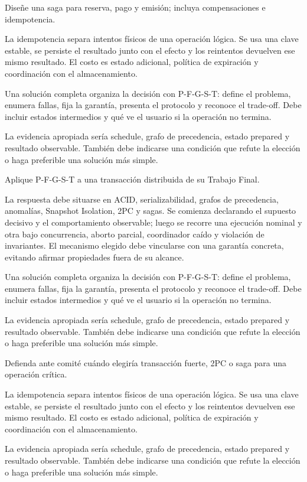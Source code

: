 \documentclass[variant=guia,cover=institutional,mode=screen]{ua-engineering-v6-article}
\begin{document}
\begin{uaexercise}
Diseñe una saga para reserva, pago y emisión; incluya compensaciones e idempotencia.
\end{uaexercise}
\begin{uaanswer}
La idempotencia separa intentos físicos de una operación lógica. Se usa una clave estable, se persiste el resultado junto con el efecto y los reintentos devuelven ese mismo resultado. El costo es estado adicional, política de expiración y coordinación con el almacenamiento.

Una solución completa organiza la decisión con P-F-G-S-T: define el problema, enumera fallas, fija la garantía, presenta el protocolo y reconoce el trade-off. Debe incluir estados intermedios y qué ve el usuario si la operación no termina.

La evidencia apropiada sería schedule, grafo de precedencia, estado prepared y resultado observable. También debe indicarse una condición que refute la elección o haga preferible una solución más simple.
\end{uaanswer}

\begin{uaexercise}
Aplique P-F-G-S-T a una transacción distribuida de su Trabajo Final.
\end{uaexercise}
\begin{uaanswer}
La respuesta debe situarse en ACID, serializabilidad, grafos de precedencia, anomalías, Snapshot Isolation, 2PC y sagas. Se comienza declarando el supuesto decisivo y el comportamiento observable; luego se recorre una ejecución nominal y otra bajo concurrencia, aborto parcial, coordinador caído y violación de invariantes. El mecanismo elegido debe vincularse con una garantía concreta, evitando afirmar propiedades fuera de su alcance.

Una solución completa organiza la decisión con P-F-G-S-T: define el problema, enumera fallas, fija la garantía, presenta el protocolo y reconoce el trade-off. Debe incluir estados intermedios y qué ve el usuario si la operación no termina.

La evidencia apropiada sería schedule, grafo de precedencia, estado prepared y resultado observable. También debe indicarse una condición que refute la elección o haga preferible una solución más simple.
\end{uaanswer}

\begin{uaexercise}
Defienda ante comité cuándo elegiría transacción fuerte, 2PC o saga para una operación crítica.
\end{uaexercise}
\begin{uaanswer}
La idempotencia separa intentos físicos de una operación lógica. Se usa una clave estable, se persiste el resultado junto con el efecto y los reintentos devuelven ese mismo resultado. El costo es estado adicional, política de expiración y coordinación con el almacenamiento.

La evidencia apropiada sería schedule, grafo de precedencia, estado prepared y resultado observable. También debe indicarse una condición que refute la elección o haga preferible una solución más simple.
\end{uaanswer}
\end{document}

